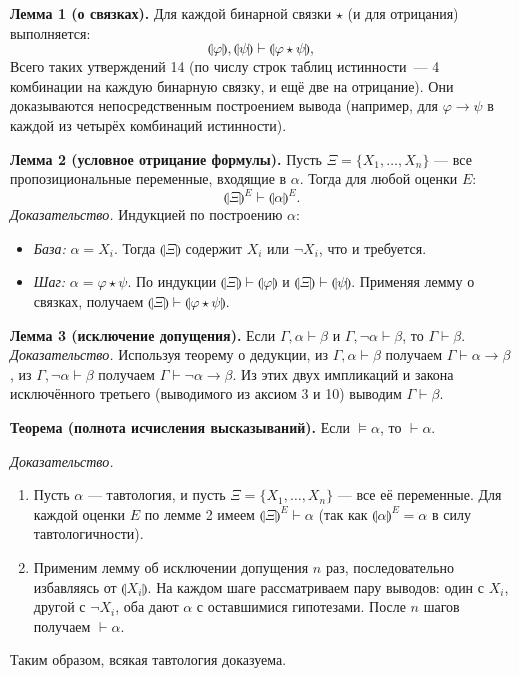 \documentclass[10pt]{article}
\begin{document}
\textbf{Лемма 1 (о связках).} Для каждой бинарной связки $\star$ (и для отрицания) выполняется:
\[
\llparenthesis\varphi\rrparenthesis,\llparenthesis\psi\rrparenthesis \vdash \llparenthesis\varphi\star\psi\rrparenthesis,
\]
Всего таких утверждений 14 (по числу строк таблиц истинности~--- 4 комбинации на каждую бинарную связку, и ещё две на отрицание). Они доказываются непосредственным построением вывода (например, для $\varphi\rightarrow\psi$ в каждой из четырёх комбинаций истинности).

\textbf{Лемма 2 (условное отрицание формулы).} Пусть $\Xi = \{X_1,\dots,X_n\}$ — все пропозициональные переменные, входящие в $\alpha$. Тогда для любой оценки $E$:
\[
\llparenthesis\Xi\rrparenthesis^E \vdash \llparenthesis\alpha\rrparenthesis^E.
\]
\emph{Доказательство.} Индукцией по построению $\alpha$:
\begin{itemize}
  \item \textit{База:} $\alpha = X_i$. Тогда $\llparenthesis\Xi\rrparenthesis$ содержит $X_i$ или $\neg X_i$, что и требуется.
  \item \textit{Шаг:} $\alpha = \varphi\star\psi$. По индукции $\llparenthesis\Xi\rrparenthesis \vdash \llparenthesis\varphi\rrparenthesis$ и $\llparenthesis\Xi\rrparenthesis \vdash \llparenthesis\psi\rrparenthesis$. Применяя лемму о связках, получаем $\llparenthesis\Xi\rrparenthesis \vdash \llparenthesis\varphi\star\psi\rrparenthesis$.
\end{itemize}

\textbf{Лемма 3 (исключение допущения).} Если $\Gamma,\alpha\vdash\beta$ и $\Gamma,\neg\alpha\vdash\beta$, то $\Gamma\vdash\beta$.
\emph{Доказательство.} Используя теорему о дедукции, из $\Gamma,\alpha\vdash\beta$ получаем $\Gamma\vdash\alpha\rightarrow\beta$, из $\Gamma,\neg\alpha\vdash\beta$ получаем $\Gamma\vdash\neg\alpha\rightarrow\beta$. Из этих двух импликаций и закона исключённого третьего (выводимого из аксиом 3 и 10) выводим $\Gamma\vdash\beta$.

\textbf{Теорема (полнота исчисления высказываний).} Если $\models\alpha$, то $\vdash\alpha$.

\emph{Доказательство.}
\begin{enumerate}
  \item Пусть $\alpha$ — тавтология, и пусть $\Xi = \{X_1,\dots,X_n\}$ — все её переменные. Для каждой оценки $E$ по лемме 2 имеем $\llparenthesis\Xi\rrparenthesis^E \vdash \alpha$ (так как $\llparenthesis\alpha\rrparenthesis^E = \alpha$ в силу тавтологичности).
  \item Применим лемму об исключении допущения $n$ раз, последовательно избавляясь от $\llparenthesis X_i\rrparenthesis$. На каждом шаге рассматриваем пару выводов: один с $X_i$, другой с $\neg X_i$, оба дают $\alpha$ с оставшимися гипотезами. После $n$ шагов получаем $\vdash\alpha$.
\end{enumerate}
Таким образом, всякая тавтология доказуема.
\end{document}
